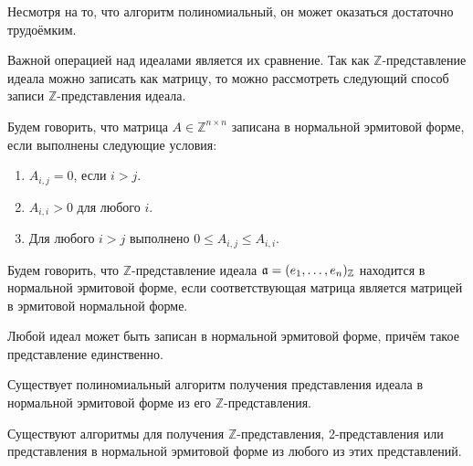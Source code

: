 \documentclass[_00_autoref.tex]{subfiles}
\begin{document}
\begin{remark}
    Несмотря на то, что алгоритм полиномиальный, он может оказаться достаточно трудоёмким.
\end{remark}

Важной операцией над идеалами является их сравнение.
Так как $\mathbb{Z}$-представление идеала можно записать как матрицу, то можно рассмотреть следующий способ записи $\mathbb{Z}$-представления идеала.

\begin{definition}
    Будем говорить, что матрица $A \in \mathbb{Z}^{n \times n}$ записана в нормальной эрмитовой форме, если выполнены следующие условия:
    \begin{enumerate}
        \item $A_{i, j} = 0$, если $i > j$.
        
        \item $A_{i,i} > 0$ для любого $i$.
        
        \item Для любого $i > j$ выполнено $0 \leq A_{i, j} \leq A_{i, i}$.
    \end{enumerate}
\end{definition}

\begin{definition}
    Будем говорить, что $\mathbb{Z}$-представление идеала $\mathfrak{a} = (e_1,\dots,e_n)_{\mathbb{Z}}$ находится в нормальной эрмитовой форме, если соответствующая матрица является матрицей в эрмитовой нормальной форме.
\end{definition}

\begin{statement}
    Любой идеал может быть записан в нормальной эрмитовой форме, причём такое представление единственно.
\end{statement}

\begin{statement}
    Существует полиномиальный алгоритм получения представления идеала в нормальной эрмитовой форме из его $\mathbb{Z}$-представления.
\end{statement}

\begin{corollary}
    Существуют алгоритмы для получения $\mathbb{Z}$-представления, 2-представления или представления в нормальной эрмитовой форме из любого из этих представлений.
\end{corollary}
\end{document}

